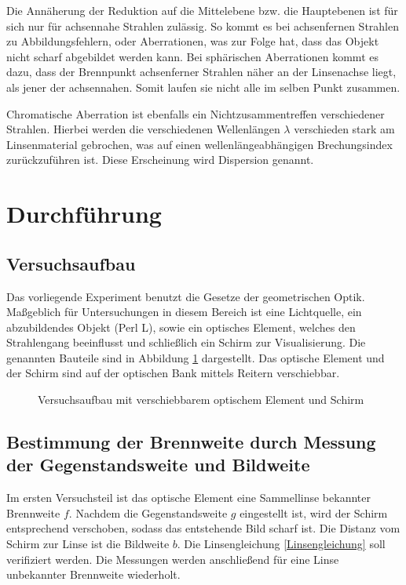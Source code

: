 Die Annäherung der Reduktion auf die Mittelebene bzw. die Hauptebenen ist für sich nur für achsennahe Strahlen zulässig. So kommt
es bei achsenfernen Strahlen zu Abbildungsfehlern, oder Aberrationen, was zur Folge hat, dass das Objekt nicht scharf abgebildet
werden kann. Bei sphärischen Aberrationen kommt es dazu, dass der Brennpunkt achsenferner Strahlen näher an der Linsenachse liegt,
als jener der achsennahen. Somit laufen sie nicht alle im selben Punkt zusammen. 

Chromatische Aberration ist ebenfalls ein Nichtzusammentreffen verschiedener Strahlen. Hierbei werden die verschiedenen Wellenlängen
$\lambda$ verschieden stark am Linsenmaterial gebrochen, was auf einen wellenlängeabhängigen Brechungsindex zurückzuführen ist. Diese
Erscheinung wird Dispersion genannt.

\section{Durchführung}
\subsection{Versuchsaufbau}
Das vorliegende Experiment benutzt die Gesetze der geometrischen Optik. Maßgeblich für Untersuchungen in diesem Bereich ist eine Lichtquelle,
ein abzubildendes Objekt (Perl L), sowie ein optisches Element, welches den Strahlengang beeinflusst und schließlich ein Schirm zur
Visualisierung. Die genannten Bauteile sind in Abbildung \ref{aufbau} dargestellt. Das optische Element und der Schirm sind auf der optischen
Bank mittels Reitern verschiebbar.

\begin{figure}[H]

\caption{Versuchsaufbau mit verschiebbarem optischem Element und Schirm}
\label{aufbau}
\end{figure}

\subsection[Messung von Gegenstandsweite und Bildweite]{Bestimmung der Brennweite durch Messung der Gegenstandsweite und Bildweite}
Im ersten Versuchsteil ist das optische Element eine Sammellinse bekannter Brennweite $f$. Nachdem die Gegenstandsweite $g$ eingestellt ist,
wird der Schirm entsprechend verschoben, sodass das entstehende Bild scharf ist. Die Distanz vom Schirm zur Linse ist die Bildweite $b$.
Die Linsengleichung \eqref{Linsengleichung} soll verifiziert werden. Die Messungen werden anschließend für eine Linse unbekannter Brennweite
wiederholt.

